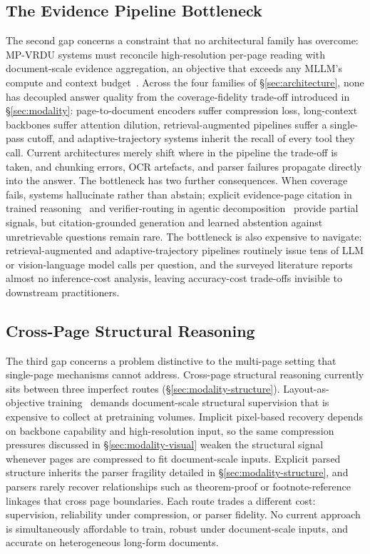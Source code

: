 \documentclass[11pt]{article}
\begin{document}
\subsection{The Evidence Pipeline Bottleneck}
\label{sec:gap-evidence}

The second gap concerns a constraint that no architectural family has overcome: MP-VRDU systems must reconcile high-resolution per-page reading with document-scale evidence aggregation, an objective that exceeds any MLLM's compute and context budget~\cite{ma2024mmlongbenchdoc}. Across the four families of \S\ref{sec:architecture}, none has decoupled answer quality from the coverage-fidelity trade-off introduced in \S\ref{sec:modality}: page-to-document encoders suffer compression loss, long-context backbones suffer attention dilution, retrieval-augmented pipelines suffer a single-pass cutoff, and adaptive-trajectory systems inherit the recall of every tool they call. Current architectures merely shift where in the pipeline the trade-off is taken, and chunking errors, OCR artefacts, and parser failures propagate directly into the answer. The bottleneck has two further consequences. When coverage fails, systems hallucinate rather than abstain; explicit evidence-page citation in trained reasoning~\cite{xiong2026docr1} and verifier-routing in agentic decomposition~\cite{zhu2025doclens,yu2025mact} provide partial signals, but citation-grounded generation and learned abstention against unretrievable questions remain rare. The bottleneck is also expensive to navigate: retrieval-augmented and adaptive-trajectory pipelines routinely issue tens of LLM or vision-language model calls per question, and the surveyed literature reports almost no inference-cost analysis, leaving accuracy-cost trade-offs invisible to downstream practitioners.

\subsection{Cross-Page Structural Reasoning}
\label{sec:gap-structure}

The third gap concerns a problem distinctive to the multi-page setting that single-page mechanisms cannot address. Cross-page structural reasoning currently sits between three imperfect routes (\S\ref{sec:modality-structure}). Layout-as-objective training~\cite{hu2025mplugdocowl2,duan2025docopilot} demands document-scale structural supervision that is expensive to collect at pretraining volumes. Implicit pixel-based recovery depends on backbone capability and high-resolution input, so the same compression pressures discussed in \S\ref{sec:modality-visual} weaken the structural signal whenever pages are compressed to fit document-scale inputs. Explicit parsed structure inherits the parser fragility detailed in \S\ref{sec:modality-structure}, and parsers rarely recover relationships such as theorem-proof or footnote-reference linkages that cross page boundaries. Each route trades a different cost: supervision, reliability under compression, or parser fidelity. No current approach is simultaneously affordable to train, robust under document-scale inputs, and accurate on heterogeneous long-form documents.
\end{document}
